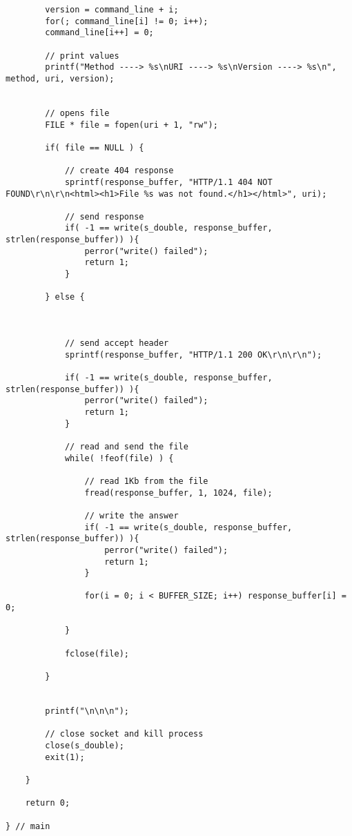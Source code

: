 \begin{lstlisting}
        version = command_line + i;
        for(; command_line[i] != 0; i++);
        command_line[i++] = 0;

        // print values
        printf("Method ----> %s\nURI ----> %s\nVersion ----> %s\n", method, uri, version);


        // opens file
        FILE * file = fopen(uri + 1, "rw");

        if( file == NULL ) {
            
            // create 404 response
            sprintf(response_buffer, "HTTP/1.1 404 NOT FOUND\r\n\r\n<html><h1>File %s was not found.</h1></html>", uri);
            
            // send response
            if( -1 == write(s_double, response_buffer, strlen(response_buffer)) ){
                perror("write() failed");
                return 1;
            }

        } else {
            


            // send accept header
            sprintf(response_buffer, "HTTP/1.1 200 OK\r\n\r\n");

            if( -1 == write(s_double, response_buffer, strlen(response_buffer)) ){
                perror("write() failed");
                return 1;
            }

            // read and send the file
            while( !feof(file) ) {
                
                // read 1Kb from the file
                fread(response_buffer, 1, 1024, file);

                // write the answer
                if( -1 == write(s_double, response_buffer, strlen(response_buffer)) ){
                    perror("write() failed");
                    return 1;
                }

                for(i = 0; i < BUFFER_SIZE; i++) response_buffer[i] = 0;

            }

            fclose(file);

        }

        
        printf("\n\n\n");

        // close socket and kill process
        close(s_double);
        exit(1);

    }

    return 0;

} // main

\end{lstlisting}

